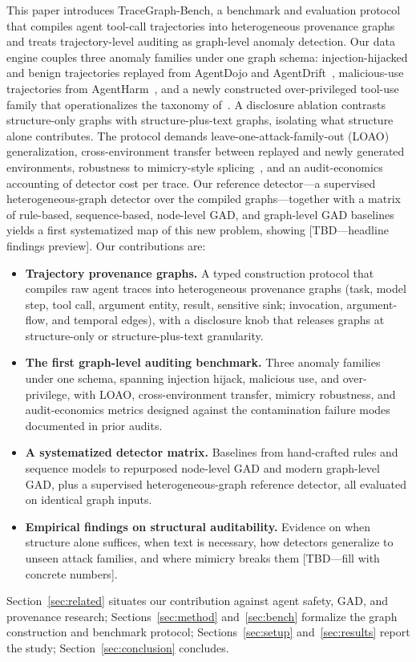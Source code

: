 This paper introduces TraceGraph-Bench, a benchmark and evaluation protocol that compiles agent tool-call trajectories into heterogeneous provenance graphs and treats trajectory-level auditing as graph-level anomaly detection. Our data engine couples three anomaly families under one graph schema: injection-hijacked and benign trajectories replayed from AgentDojo and AgentDrift~\cite{debenedetti2024agentdojo,pinjari2026agentdrift}, malicious-use trajectories from AgentHarm~\cite{andriushchenko2024agentharm}, and a newly constructed over-privileged tool-use family that operationalizes the taxonomy of~\cite{yang2026when}. A disclosure ablation contrasts structure-only graphs with structure-plus-text graphs, isolating what structure alone contributes. The protocol demands leave-one-attack-family-out (LOAO) generalization, cross-environment transfer between replayed and newly generated environments, robustness to mimicry-style splicing~\cite{goyal2023sometimes}, and an audit-economics accounting of detector cost per trace. Our reference detector---a supervised heterogeneous-graph detector over the compiled graphs---together with a matrix of rule-based, sequence-based, node-level GAD, and graph-level GAD baselines yields a first systematized map of this new problem, showing [TBD---headline findings preview]. Our contributions are:
\begin{itemize}
  \item \textbf{Trajectory provenance graphs.} A typed construction protocol that compiles raw agent traces into heterogeneous provenance graphs (task, model step, tool call, argument entity, result, sensitive sink; invocation, argument-flow, and temporal edges), with a disclosure knob that releases graphs at structure-only or structure-plus-text granularity.
  \item \textbf{The first graph-level auditing benchmark.} Three anomaly families under one schema, spanning injection hijack, malicious use, and over-privilege, with LOAO, cross-environment transfer, mimicry robustness, and audit-economics metrics designed against the contamination failure modes documented in prior audits.
  \item \textbf{A systematized detector matrix.} Baselines from hand-crafted rules and sequence models to repurposed node-level GAD and modern graph-level GAD, plus a supervised heterogeneous-graph reference detector, all evaluated on identical graph inputs.
  \item \textbf{Empirical findings on structural auditability.} Evidence on when structure alone suffices, when text is necessary, how detectors generalize to unseen attack families, and where mimicry breaks them [TBD---fill with concrete numbers].
\end{itemize}
Section~\ref{sec:related} situates our contribution against agent safety, GAD, and provenance research; Sections~\ref{sec:method} and~\ref{sec:bench} formalize the graph construction and benchmark protocol; Sections~\ref{sec:setup} and~\ref{sec:results} report the study; Section~\ref{sec:conclusion} concludes.
